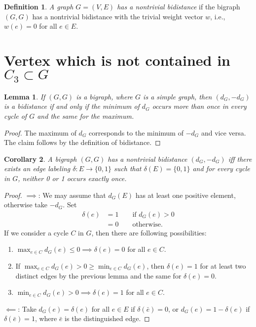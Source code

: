 \documentclass[a4paper, 11pt]{article}
\newtheorem{lem}{Lemma}[section]
\newtheorem{cor}[lem]{Corollary}
\theoremstyle{definition}
\newtheorem{defn}{Definition}[section]
\begin{document}
\begin{defn}
\emph{A graph $G=(V,E)$ has a nontrivial bidistance} if the bigraph $(G,G)$ has a nontrivial bidistance with the trivial weight vector $w$, i.e., $w(e)=0$ for all $e\in E$.
\end{defn}


\section{Vertex which is not contained in $C_3\subset G$}
\begin{lem}
If $(G,G)$ is a bigraph, where $G$ is a simple graph, then $(d_G, -d_G)$ is a bidistance if and only if the minimum of $d_G$ occurs more than once in every cycle of $G$ and the same for the maximum.
\end{lem}
\begin{proof}
The maximum of $d_G$ corresponds to the minimum of $-d_G$ and vice versa. The claim follows by the definition of bidistance.
\end{proof}

\begin{cor}
\label{cor:binaryLabelling}
A bigraph $(G,G)$ has a nontrivial bidistance $(d_G, -d_G)$ iff there exists an edge labeling $\delta:E\rightarrow \{0,1\}$ such that $\delta(E)=\{0,1\}$ and for every cycle in $G$, neither 0 or 1 occurs exactly once.
\end{cor}
\begin{proof}
$\implies$: We may assume that $d_G(E)$ has at least one positive element, otherwise take $-d_G$. Set
\begin{align*}
\delta(e)&=1 \qquad \text{if } d_G(e)>0 \\
		&=0 \qquad \text{otherwise.}
\end{align*}
If we consider a cycle $C$ in $G$, then there are following possibilities:
\begin{enumerate}
	\item $\max_{e\in C} d_G(e) \leq 0 \implies \delta(e)=0$ for all $e \in C$.
	\item If $\max_{e\in C} d_G(e) > 0 \geq \min_{e\in C} d_G(e)$, then $\delta(e)=1$ for at least two distinct edges by the previous lemma and the same for $\delta(e)=0$.
	\item $\min_{e\in C} d_G(e) > 0 \implies \delta(e)=1$ for all $e \in C$.
\end{enumerate}
$\impliedby$: Take $d_G(e)=\delta(e)$ for all $e\in E$ if $\delta(\bar{e})=0$, or $d_G(e)=1-\delta(e)$ if $\delta(\bar{e})=1$, where $\bar{e}$ is the distinguished edge.
\end{proof}
\end{document}

